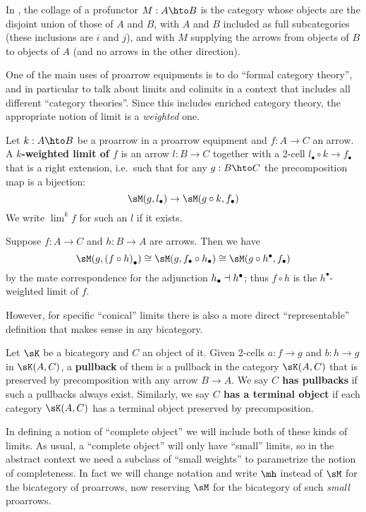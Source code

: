 \documentclass{amsart}
\def\rep#1{{#1}_\bullet}
\def\corep#1{{#1}^\bullet}
\let\mylim\lim
\def\lim{{\textstyle\mylim}}
\begin{document}
\begin{eg}
  In \cProf, the collage of a profunctor $M:A\hto B$ is the category whose objects are the disjoint union of those of $A$ and $B$, with $A$ and $B$ included as full subcategories (these inclusions are $i$ and $j$), and with $M$ supplying the arrows from objects of $B$ to objects of $A$ (and no arrows in the other direction).
\end{eg}

One of the main uses of proarrow equipments is to do ``formal category theory'', and in particular to talk about limits and colimits in a context that includes all different ``category theories''.
Since this includes enriched category theory, the appropriate notion of limit is a \emph{weighted} one.

\begin{defn}
  Let $k:A\hto B$ be a proarrow in a proarrow equipment and $f:A\to C$ an arrow.
  A \textbf{$k$-weighted limit of $f$} is an arrow $l:B\to C$ together with a 2-cell $\rep l \circ k \to \rep f$ that is a right extension, i.e.\ such that for any $g:B\hto C$ the precomposition map is a bijection:
  \[ \sM(g,\rep l) \to \sM(g\circ k,\rep f) \]
  We write $\lim^k f$ for such an $l$ if it exists.
\end{defn}

\begin{eg}\label{eg:lim-comp}
  Suppose $f:A\to C$ and $h:B\to A$ are arrows.
  Then we have
  \[ \sM(g,\rep{(f\circ h)}) \cong \sM(g,\rep f \circ \rep h) \cong \sM(g\circ \corep h, \rep f) \]
  by the mate correspondence for the adjunction $\rep h \adj \corep h$; thus $f\circ h$ is the $\corep h$-weighted limit of $f$.
\end{eg}

However, for specific ``conical'' limits there is also a more direct ``representable'' definition that makes sense in any bicategory.

\begin{defn}
  Let $\sK$ be a bicategory and $C$ an object of it.
  Given 2-cells $a:f\to g$ and $b:h\to g$ in $\sK(A,C)$, a \textbf{pullback} of them is a pullback in the category $\sK(A,C)$ that is preserved by precomposition with any arrow $B\to A$.
  We say \textbf{$C$ has pullbacks} if such a pullbacks always exist.
  Similarly, we say \textbf{$C$ has a terminal object} if each category $\sK(A,C)$ has a terminal object preserved by precomposition.
\end{defn}

In defining a notion of ``complete object'' we will include both of these kinds of limits.
As usual, a ``complete object'' will only have ``small'' limits, so in the abstract context we need a subclass of ``small weights'' to parametrize the notion of completeness.
In fact we will change notation and write $\mh$ instead of $\sM$ for the bicategory of proarrows, now reserving $\sM$ for the bicategory of such \emph{small} proarrows.
\end{document}
